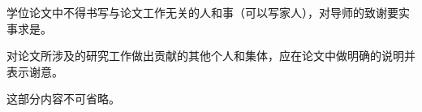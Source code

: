 
\begin{acknowledgement}

学位论文中不得书写与论文工作无关的人和事（可以写家人），对导师的致谢要实事求是。

对论文所涉及的研究工作做出贡献的其他个人和集体，应在论文中做明确的说明并表示谢意。

这部分内容不可省略。

\end{acknowledgement}


